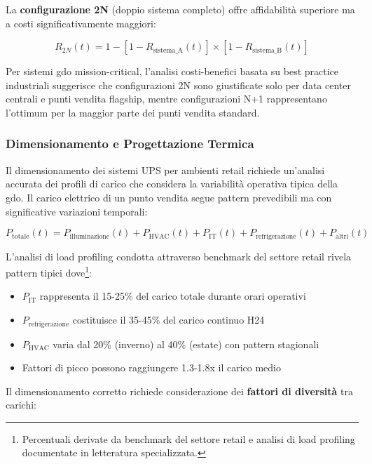 La \textbf{configurazione 2N} (doppio sistema completo) offre affidabilità superiore ma a costi significativamente maggiori:

\begin{equation}
R_{2N}(t) = 1 - [1 - R_{\text{sistema\_A}}(t)] \times [1 - R_{\text{sistema\_B}}(t)]
\label{eq:affidabilita-2n}
\end{equation}

Per sistemi \gls{gdo} mission-critical, l'analisi costi-benefici basata su best practice industriali suggerisce che configurazioni 2N sono giustificate solo per data center centrali e punti vendita flagship, mentre configurazioni N+1 rappresentano l'ottimum per la maggior parte dei punti vendita standard.

\subsubsection{Dimensionamento e Progettazione Termica}

Il dimensionamento dei sistemi UPS per ambienti retail richiede un'analisi accurata dei profili di carico che considera la variabilità operativa tipica della \gls{gdo}. Il carico elettrico di un punto vendita segue pattern prevedibili ma con significative variazioni temporali:

\begin{equation}
P_{\text{totale}}(t) = P_{\text{illuminazione}}(t) + P_{\text{HVAC}}(t) + P_{\text{IT}}(t) + P_{\text{refrigerazione}}(t) + P_{\text{altri}}(t)
\label{eq:carico-totale}
\end{equation}

L'analisi di load profiling condotta attraverso benchmark del settore retail rivela pattern tipici dove\footnote{Percentuali derivate da benchmark del settore retail e analisi di load profiling documentate in letteratura specializzata.}:
\begin{itemize}
    \item $P_{\text{IT}}$ rappresenta il 15-25\% del carico totale durante orari operativi
    \item $P_{\text{refrigerazione}}$ costituisce il 35-45\% del carico continuo H24
    \item $P_{\text{HVAC}}$ varia dal 20\% (inverno) al 40\% (estate) con pattern stagionali
    \item Fattori di picco possono raggiungere 1.3-1.8x il carico medio
\end{itemize}

Il dimensionamento corretto richiede considerazione dei \textbf{fattori di diversità} tra carichi:

